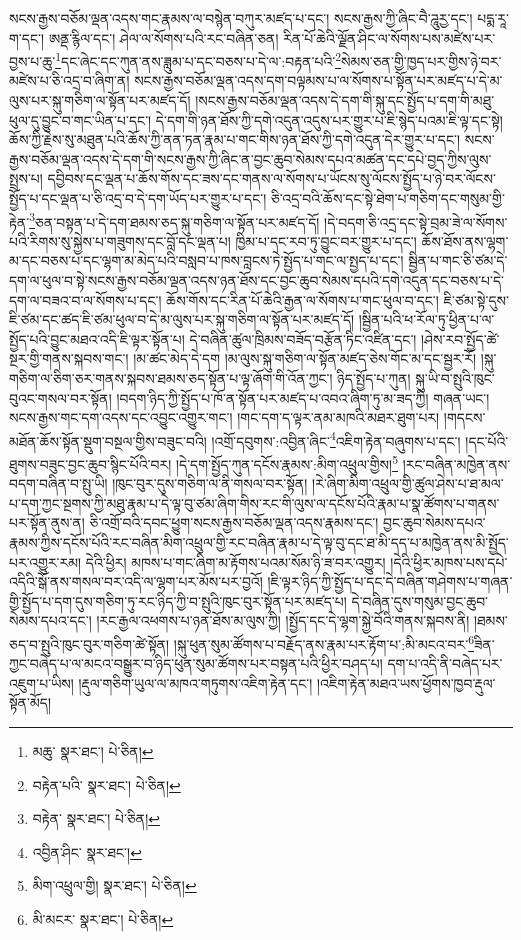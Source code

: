 སངས་རྒྱས་བཅོམ་ལྡན་འདས་གང་རྣམས་ལ་བསྙེན་བཀུར་མཛད་པ་དང་། སངས་རྒྱས་ཀྱི་ཞིང་བཻ་ཌཱུརྱ་དང་། པདྨ་རཱ་ག་དང་། ཨནྡ་རྙིལ་དང་། ཤེལ་ལ་སོགས་པའི་རང་བཞིན་ཅན། རིན་པོ་ཆེའི་ལྗོན་ཤིང་ལ་སོགས་པས་མཛེས་པར་བྱས་པ་ཆུ་\footnote{མཆུ་  སྣར་ཐང་།  པེ་ཅིན། }དང་ཞེང་དང་ཀུན་ནས་ཟླུམ་པ་དང་བཅས་པ་དེ་ལ་:བརྟན་པའི་\footnote{བརྟེན་པའི་  སྣར་ཐང་།  པེ་ཅིན། }སེམས་ཅན་གྱི་ཁྱད་པར་གྱིས་ཉེ་བར་མཛེས་པ་ཅི་འདྲ་བ་ཞིག་ན། སངས་རྒྱས་བཅོམ་ལྡན་འདས་དག་བལྟམས་པ་ལ་སོགས་པ་སྟོན་པར་མཛད་པ་དེ་མ་ལུས་པར་སྐུ་གཅིག་ལ་སྟོན་པར་མཛད་དོ། །སངས་རྒྱས་བཅོམ་ལྡན་འདས་དེ་དག་གི་སྐུ་དང་སྤྱོད་པ་དག་གི་མཐུ་ཕུལ་དུ་བྱུང་བ་གང་ཡིན་པ་དང་། དེ་དག་གི་ཉན་ཐོས་ཀྱི་དགེ་འདུན་འདུས་པར་གྱུར་པ་ཇི་སྙེད་པའམ་ཇི་ལྟ་དང་སྟེ། ཆོས་ཀྱི་རྗེས་སུ་མཐུན་པའི་ཆོས་ཀྱི་ནན་ཏན་རྣམ་པ་གང་གིས་ཉན་ཐོས་ཀྱི་དགེ་འདུན་དེར་གྱུར་པ་དང་། སངས་རྒྱས་བཅོམ་ལྡན་འདས་དེ་དག་གི་སངས་རྒྱས་ཀྱི་ཞིང་ན་བྱང་ཆུབ་སེམས་དཔའ་མཚན་དང་དཔེ་བྱད་ཀྱིས་ལུས་སྤྲས་པ། དབྱིབས་དང་ལྡན་པ་ཆོས་གོས་དང་ཟས་དང་གནས་ལ་སོགས་པ་ཡོངས་སུ་ལོངས་སྤྱོད་པ་ཉེ་བར་ལོངས་སྤྱོད་པ་དང་ལྡན་པ་ཅི་འདྲ་བ་དེ་དག་ཡོད་པར་གྱུར་པ་དང་། ཅི་འདྲ་བའི་ཆོས་དང་སྟེ་ཐེག་པ་གཅིག་དང་གསུམ་གྱི་རྟེན་\footnote{བརྟེན་  སྣར་ཐང་།  པེ་ཅིན། }ཅན་བསྟན་པ་དེ་དག་ཐམས་ཅད་སྐུ་གཅིག་ལ་སྟོན་པར་མཛད་དོ། །དེ་བདག་ཅི་འདྲ་དང་སྟེ་བྲམ་ཟེ་ལ་སོགས་པའི་རིགས་སུ་སྐྱེས་པ་གཟུགས་དང་བློ་དང་ལྡན་པ། ཁྱིམ་པ་དང་རབ་ཏུ་བྱུང་བར་གྱུར་པ་དང་། ཆོས་ཐོས་ནས་ལྷག་མ་དང་བཅས་པ་དང་ལྷག་མ་མེད་པའི་བསླབ་པ་ཁས་བླངས་ཏེ་སྤྱོད་པ་གང་ལ་སྤྱད་པ་དང་། སྦྱིན་པ་གང་ཅི་ཙམ་དེ་དག་ལ་ཕུལ་བ་སྟེ་སངས་རྒྱས་བཅོམ་ལྡན་འདས་ཉན་ཐོས་དང་བྱང་ཆུབ་སེམས་དཔའི་དགེ་འདུན་དང་བཅས་པ་དེ་དག་ལ་བཟའ་བ་ལ་སོགས་པ་དང་། ཆོས་གོས་དང་རིན་པོ་ཆེའི་རྒྱན་ལ་སོགས་པ་གང་ཕུལ་བ་དང་། ཇི་ཙམ་སྟེ་དུས་ཇི་ཙམ་དང་ཚད་ཇི་ཙམ་ཕུལ་བ་དེ་མ་ལུས་པར་སྐུ་གཅིག་ལ་སྟོན་པར་མཛད་དོ། །སྦྱིན་པའི་ཕ་རོལ་ཏུ་ཕྱིན་པ་ལ་སྤྱོད་པའི་བྱུང་མཐའ་འདི་ཇི་ལྟར་སྟོན་པ། དེ་བཞིན་ཚུལ་ཁྲིམས་བཟོད་བརྩོན་ཏིང་འཛིན་དང་། །ཤེས་རབ་སྤྱོད་ཚེ་སྔར་གྱི་གནས་སྐབས་གང་། །མ་ཚང་མེད་དེ་དག །མ་ལུས་སྐུ་གཅིག་ལ་སྟོན་མཛད་ཅེས་གོང་མ་དང་སྦྱར་རོ། །སྐུ་གཅིག་ལ་ཅིག་ཅར་གནས་སྐབས་ཐམས་ཅད་སྟོན་པ་ལྟ་ཞོག་གི་འོན་ཀྱང་། ཉིད་སྤྱོད་པ་ཀུན། སྐུ་ཡི་བ་སྤུའི་ཁུང་བུའང་གསལ་བར་སྟོན། །བདག་ཉིད་ཀྱི་སྤྱོད་པ་ཁོ་ན་སྟོན་པར་མཛད་པ་འབའ་ཞིག་ཏུ་མ་ཟད་ཀྱི། གཞན་ཡང་། སངས་རྒྱས་གང་དག་འདས་དང་འབྱུང་འགྱུར་གང་། །གང་དག་ད་ལྟར་ནམ་མཁའི་མཐར་ཐུག་པར། །གདངས་མཐོན་ཆོས་སྟོན་སྡུག་བསྔལ་གྱིས་བཟུང་བའི། །འགྲོ་དབུགས་:འབྱིན་ཞིང་\footnote{འབྱིན་ཤིང་  སྣར་ཐང་། }འཇིག་རྟེན་བཞུགས་པ་དང་། །དང་པོའི་ཐུགས་བཟུང་བྱང་ཆུབ་སྙིང་པོའི་བར། །དེ་དག་སྤྱོད་ཀུན་དངོས་རྣམས་:མིག་འཕྲུལ་གྱིས།\footnote{མིག་འཕྲུལ་གྱི།  སྣར་ཐང་།  པེ་ཅིན། } །རང་བཞིན་མཁྱེན་ནས་བདག་བཞིན་བ་སྤུ་ཡི། །ཁུང་བུར་དུས་གཅིག་ལ་ནི་གསལ་བར་སྟོན། །རེ་ཞིག་མིག་འཕྲུལ་གྱི་ཚུལ་ཤེས་པ་ཐ་མལ་པ་དག་ཀྱང་སྔགས་ཀྱི་མཐུ་རྣམ་པ་དེ་ལྟ་བུ་ཙམ་ཞིག་གིས་རང་གི་ལུས་ལ་དངོས་པོའི་རྣམ་པ་སྣ་ཚོགས་པ་གནས་པར་སྟོན་ནུས་ན། ཅི་འགྲོ་བའི་དབང་ཕྱུག་སངས་རྒྱས་བཅོམ་ལྡན་འདས་རྣམས་དང་། བྱང་ཆུབ་སེམས་དཔའ་རྣམས་ཀྱིས་དངོས་པོའི་རང་བཞིན་མིག་འཕྲུལ་གྱི་རང་བཞིན་རྣམ་པ་དེ་ལྟ་བུ་དང་ཐ་མི་དད་པ་མཁྱེན་ནས་མི་སྤྱོད་པར་འགྱུར་རམ། དེའི་ཕྱིར། མཁས་པ་གང་ཞིག་མ་རྟོགས་པའམ་སོམ་ཉི་ཟ་བར་འགྱུར། །དེའི་ཕྱིར་མཁས་པས་དཔེ་འདིའི་སྒོ་ནས་གསལ་བར་འདི་ལ་ལྷག་པར་མོས་པར་བྱའོ། །ཇི་ལྟར་ཉིད་ཀྱི་སྤྱོད་པ་དང་དེ་བཞིན་གཤེགས་པ་གཞན་གྱི་སྤྱོད་པ་དག་དུས་གཅིག་ཏུ་རང་ཉིད་ཀྱི་བ་སྤུའི་ཁུང་བུར་སྟོན་པར་མཛད་པ། དེ་བཞིན་དུས་གསུམ་བྱང་ཆུབ་སེམས་དཔའ་དང་། །རང་རྒྱལ་འཕགས་པ་ཉན་ཐོས་མ་ལུས་ཀྱི། །སྤྱོད་དང་དེ་ལྷག་སྐྱེ་བོའི་གནས་སྐབས་ནི། །ཐམས་ཅད་བ་སྤུའི་ཁུང་བུར་གཅིག་ཚེ་སྟོན། །སྐུ་ཕུན་སུམ་ཚོགས་པ་བརྗོད་ནས་རྣམ་པར་རྟོག་པ་:མི་མངའ་བར་\footnote{མི་མངར་  སྣར་ཐང་།  པེ་ཅིན། }ཟིན་ཀྱང་བཞེད་པ་ལ་མངའ་བསྒྱུར་བ་ཉིད་ཕུན་སུམ་ཚོགས་པར་བསྟན་པའི་ཕྱིར་བཤད་པ། དག་པ་འདི་ནི་བཞེད་པར་འཇུག་པ་ཡིས། །རྡུལ་གཅིག་ཡུལ་ལ་མཁའ་གཏུགས་འཇིག་རྟེན་དང་། །འཇིག་རྟེན་མཐའ་ཡས་ཕྱོགས་ཁྱབ་རྡུལ་སྟོན་མོད། 